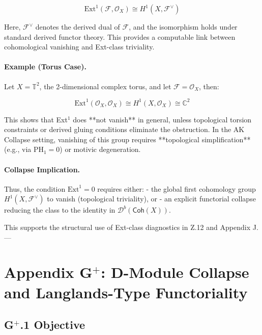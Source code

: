 \documentclass[11pt]{article}
\begin{document}
\[
\mathrm{Ext}^1(\mathcal{F}, \mathcal{O}_X) \cong H^1(X, \mathcal{F}^\vee)
\]

Here, \( \mathcal{F}^\vee \) denotes the derived dual of \( \mathcal{F} \), and the isomorphism holds under standard derived functor theory.  
This provides a computable link between cohomological vanishing and Ext-class triviality.

\vspace{1em}
\paragraph{Example (Torus Case).}

Let \( X = \mathbb{T}^2 \), the 2-dimensional complex torus, and let \( \mathcal{F} = \mathcal{O}_X \), then:

\[
\mathrm{Ext}^1(\mathcal{O}_X, \mathcal{O}_X) \cong H^1(X, \mathcal{O}_X) \cong \mathbb{C}^2
\]

This shows that Ext$^1$ does **not vanish** in general, unless topological torsion constraints or derived gluing conditions eliminate the obstruction.  
In the AK Collapse setting, vanishing of this group requires **topological simplification** (e.g., via PH$_1 = 0$) or motivic degeneration.

\vspace{1em}
\paragraph{Collapse Implication.}  
Thus, the condition \( \mathrm{Ext}^1 = 0 \) requires either:
- the global first cohomology group \( H^1(X, \mathcal{F}^\vee) \) to vanish (topological triviality), or
- an explicit functorial collapse reducing the class to the identity in \( \mathcal{D}^b(\mathsf{Coh}(X)) \).

This supports the structural use of Ext-class diagnostics in Z.12 and Appendix J.
---



\section*{Appendix G$^+$: D-Module Collapse and Langlands-Type Functoriality}

\subsection*{G$^+$.1 Objective}
\end{document}
